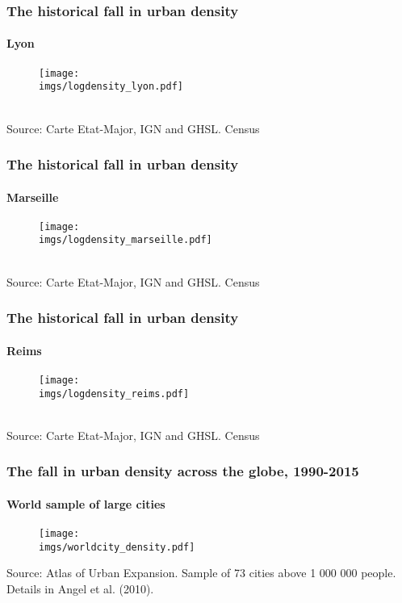 \documentclass[aspectratio=169]{beamer}
\begin{document}
\begin{frame}[label=Lyon]
\frametitle{The historical fall in urban density}
\framesubtitle{Lyon}
\begin{figure}
	\begin{center}
		\texttt{[image: \\imgs/logdensity\_lyon.pdf]}
	\end{center}
\end{figure}
\hyperlink{density}{}\\
{\tiny Source: Carte Etat-Major, IGN and GHSL. Census}
\end{frame}

\begin{frame}[label=Marseille]
\frametitle{The historical fall in urban density}
\framesubtitle{Marseille}
\begin{figure}
	\begin{center}
		\texttt{[image: \\imgs/logdensity\_marseille.pdf]}
	\end{center}
\end{figure}
\hyperlink{density}{}\\
{\tiny Source: Carte Etat-Major, IGN and GHSL. Census}
\end{frame}

\begin{frame}[label=Reims]
\frametitle{The historical fall in urban density}
\framesubtitle{Reims}
\begin{figure}
	\begin{center}
		\texttt{[image: \\imgs/logdensity\_reims.pdf]}
	\end{center}
\end{figure}
\hyperlink{density}{}\\
{\tiny Source: Carte Etat-Major, IGN and GHSL. Census}
\end{frame}

\begin{frame}[label=world_sample_city]
\frametitle{The fall in urban density across the globe, 1990-2015}
\framesubtitle{World sample of large cities}
\begin{figure}
	\begin{center}
		\texttt{[image: \\imgs/worldcity\_density.pdf]}
	\end{center}
\end{figure}
{\tiny Source: Atlas of Urban Expansion. Sample of 73 cities above 1 000 000 people. Details in Angel et al. (2010).}\\
\hyperlink{density}{}
\end{frame}
\end{document}
